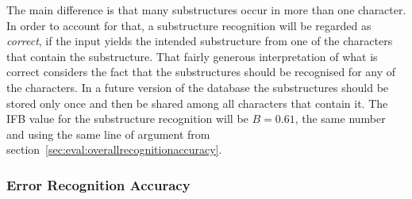 The main difference is that many substructures occur in more than one 
character. In order to account for that, 
a substructure recognition will be regarded as \emph{correct}, 
if the input yields the intended substructure from
one of the characters that contain the substructure.
That fairly generous interpretation of what is correct considers the fact
that the substructures should be recognised for any of the characters.
In a future version of the database the substructures should be stored only once
and then be shared among all characters that contain it.
The IFB value for the substructure recognition will be \(B=0.61\), 
the same number and using the same line of argument from 
section~\ref{sec:eval:overallrecognitionaccuracy}.

\subsubsection{Error Recognition Accuracy}
\label{sec:eval:errorrecognitionaccuracy}

